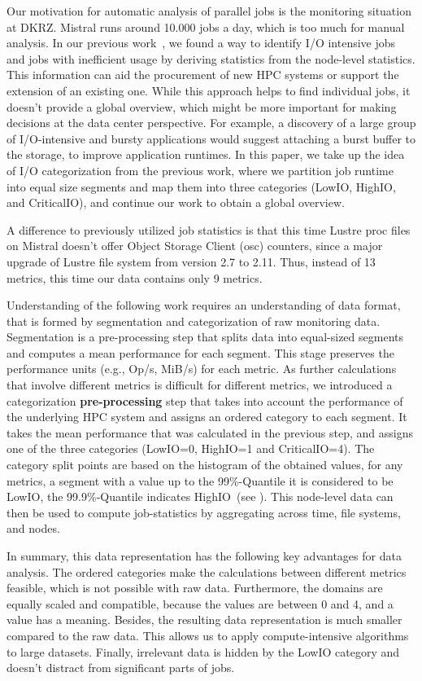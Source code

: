 \documentclass{jhps}
\begin{document}
Our motivation for automatic analysis of parallel jobs is the monitoring situation at DKRZ.
Mistral runs around 10.000 jobs a day, which is too much for manual analysis.
In our previous work~\cite{iocats2020}, we found a way to identify I/O intensive jobs and jobs with inefficient usage by deriving statistics from the node-level statistics.
This information can aid the procurement of new HPC systems or support the extension of an existing one.
While this approach helps to find individual jobs, it doesn't provide a global overview, which might be more important for making decisions at the data center perspective.
For example, a discovery of a large group of I/O-intensive and bursty applications would suggest attaching a burst buffer to the storage, to improve application runtimes.
In this paper, we take up the idea of I/O categorization from the previous work, where we partition job runtime into equal size segments and map them into three categories (LowIO, HighIO, and CriticalIO), and continue our work to obtain a global overview.

A difference to previously utilized job statistics is that this time Lustre proc files on Mistral doesn't offer Object Storage Client (osc) counters, since a major upgrade of Lustre file system from version 2.7 to 2.11.
Thus, instead of 13 metrics, this time our data contains only 9 metrics.

Understanding of the following work requires an understanding of data format, that is formed by segmentation and categorization of raw monitoring data.
Segmentation is a pre-processing step that splits data into equal-sized segments and computes a mean performance for each segment.
This stage preserves the performance units (e.g., Op/s, MiB/s) for each metric.
As further calculations that involve different metrics is difficult for different metrics, we introduced a categorization\textbf{ pre-processing} step that takes into account the performance of the underlying HPC system and assigns an ordered category to each segment.
It takes the mean performance that was calculated in the previous step, and assigns one of the three categories (LowIO=0, HighIO=1 and CriticalIO=4).
The category split points are based on the histogram of the obtained values, for any metrics, a segment with a value up to the 99\%-Quantile it is considered to be LowIO, the 99.9\%-Quantile indicates HighIO~(see \cite{iocats2020}).
This node-level data can then be used to compute job-statistics by aggregating across time, file systems, and nodes.

In summary, this data representation has the following key advantages for data analysis.
The ordered categories make the calculations between different metrics feasible, which is not possible with raw data.
Furthermore, the domains are equally scaled and compatible, because the values are between 0 and 4, and a value has a meaning.
Besides, the resulting data representation is much smaller compared to the raw data.
This allows us to apply compute-intensive algorithms to large datasets.
Finally, irrelevant data is hidden by the LowIO category and doesn't distract from significant parts of jobs.
\end{document}
